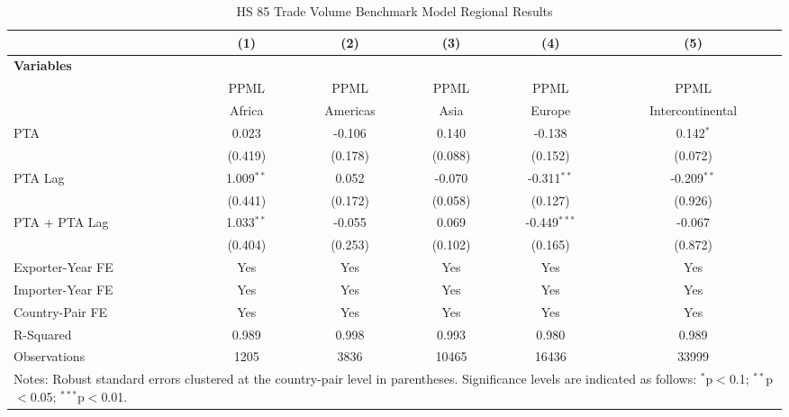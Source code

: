\begin{table}[htbp]
    \centering
    \caption{HS 85 Trade Volume Benchmark Model Regional Results}
    \label{tab:85_trade_benchmark_region_analysis}
    \begin{adjustbox}{max width=\textwidth}
    \begin{tabular}{l@{\extracolsep{1pt}}ccccc}
    \hline
    & \multicolumn{1}{c}{(1)} & \multicolumn{1}{c}{(2)} & \multicolumn{1}{c}{(3)} & \multicolumn{1}{c}{(4)} & \multicolumn{1}{c}{(5)} \\
    \hline
    \textbf{Variables} &  &  &  &  &  \\
    \hline
     & PPML & PPML & PPML & PPML & PPML \\
     & Africa & Americas & Asia & Europe & Intercontinental \\
    \hline
    PTA & 0.023 & -0.106 & 0.140 & -0.138 & 0.142$^{\ast}$ \\
    & (0.419) & (0.178) & (0.088) & (0.152) & (0.072) \\

    PTA Lag & 1.009$^{\ast\ast}$ & 0.052 & -0.070 & -0.311$^{\ast\ast}$ & -0.209$^{\ast\ast}$ \\
    & (0.441) & (0.172) & (0.058) & (0.127) & (0.926) \\

    PTA + PTA Lag & 1.033$^{\ast\ast}$ & -0.055 & 0.069 & -0.449$^{\ast\ast\ast}$ & -0.067 \\
    & (0.404) & (0.253) & (0.102) & (0.165) & (0.872) \\
    \hline
    Exporter-Year FE & Yes & Yes & Yes & Yes & Yes \\
    Importer-Year FE & Yes & Yes & Yes & Yes & Yes \\
    Country-Pair FE & Yes & Yes & Yes & Yes & Yes \\
    R-Squared & 0.989 & 0.998 & 0.993 & 0.980 & 0.989 \\
    Observations & 1205 & 3836 & 10465 & 16436 & 33999 \\
    \hline
    \multicolumn{6}{l}{\footnotesize{Notes: Robust standard errors clustered at the country-pair level in parentheses. Significance levels are indicated as follows: $^{\ast}$p$<$0.1; $^{\ast\ast}$p$<$0.05; $^{\ast\ast\ast}$p$<$0.01.}} \\
    \end{tabular}
    \end{adjustbox}
\end{table}

